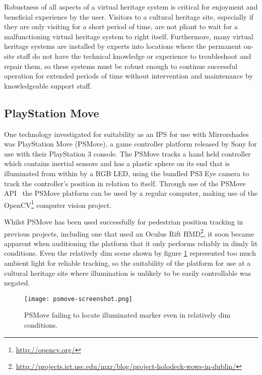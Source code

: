 Robustness of all aspects of a virtual heritage system is critical for enjoyment and beneficial experience by the user. Visitors to a cultural heritage site, especially if they are only visiting for a short period of time, are not pliant to wait for a malfunctioning virtual heritage system to right itself. Furthermore, many virtual heritage systems are installed by experts into locations where the permanent on-site staff do not have the technical knowledge or experience to troubleshoot and repair them, so these systems must be robust enough to continue successful operation for extended periods of time without intervention and maintenance by knowledgeable support staff.



\subsection{PlayStation Move}

One technology investigated for suitability as an IPS for use with Mirrorshades was PlayStation Move (PSMove), a game controller platform released by Sony for use with their PlayStation 3 console. The PSMove tracks a hand held controller which contains inertial sensors and has a plastic sphere on its end that is illuminated from within by a RGB LED, using the bundled PS3 Eye camera to track the controller's position in relation to itself. Through use of the PSMove API~\cite{Perl2012} the PSMove platform can be used by a regular computer, making use of the OpenCV\footnote{\url{http://opencv.org/}} computer vision project.

Whilst PSMove has been used successfully for pedestrian position tracking in previous projects, including one that used an Oculus Rift HMD\footnote{\url{http://projects.ict.usc.edu/mxr/blog/project-holodeck-wows-in-dublin/}}, it soon became apparent when auditioning the platform that it only performs reliably in dimly lit conditions. Even the relatively dim scene shown by figure \ref{psmove-screenshot.png} represented too much ambient light for reliable tracking, so the suitability of the platform for use at a cultural heritage site where illumination is unlikely to be easily controllable was negated.

\begin{figure}[h]
	\begin{center}
		\texttt{[image: psmove-screenshot.png]}
		\caption{PSMove failing to locate illuminated marker even in relatively dim conditions.}
		\label{psmove-screenshot.png}
	\end{center}
\end{figure}

